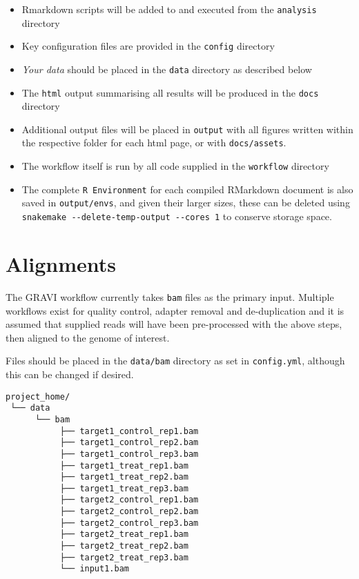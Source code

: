 \documentclass[
]{book}
\providecommand{\tightlist}{%
  \setlength{\itemsep}{0pt}\setlength{\parskip}{0pt}}
\begin{document}
\begin{itemize}
\tightlist
\item
  Rmarkdown scripts will be added to and executed from the \texttt{analysis} directory
\item
  Key configuration files are provided in the \texttt{config} directory
\item
  \emph{Your data} should be placed in the \texttt{data} directory as described below
\item
  The \texttt{html} output summarising all results will be produced in the \texttt{docs} directory
\item
  Additional output files will be placed in \texttt{output} with all figures written within the respective folder for each html page, or with \texttt{docs/assets}.
\item
  The workflow itself is run by all code supplied in the \texttt{workflow} directory
\item
  The complete \texttt{R\ Environment} for each compiled RMarkdown document is also saved in \texttt{output/envs}, and given their larger sizes, these can be deleted using \texttt{snakemake\ -\/-delete-temp-output\ -\/-cores\ 1} to conserve storage space.
\end{itemize}

\hypertarget{alignments}{%
\section{Alignments}\label{alignments}}

The GRAVI workflow currently takes \texttt{bam} files as the primary input.
Multiple workflows exist for quality control, adapter removal and de-duplication and it is assumed that supplied reads will have been pre-processed with the above steps, then aligned to the genome of interest.

Files should be placed in the \texttt{data/bam} directory as set in \texttt{config.yml}, although this can be changed if desired.

\begin{verbatim}
project_home/
 └── data
      └── bam 
           ├── target1_control_rep1.bam
           ├── target1_control_rep2.bam
           ├── target1_control_rep3.bam
           ├── target1_treat_rep1.bam
           ├── target1_treat_rep2.bam
           ├── target1_treat_rep3.bam
           ├── target2_control_rep1.bam
           ├── target2_control_rep2.bam
           ├── target2_control_rep3.bam
           ├── target2_treat_rep1.bam
           ├── target2_treat_rep2.bam
           ├── target2_treat_rep3.bam
           └── input1.bam 
\end{verbatim}
\end{document}
